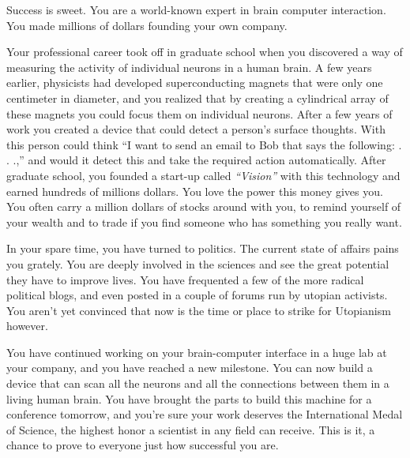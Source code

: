 \documentclass[char]{guildcamp1}
\begin{document}
\name{\cRival{}}


Success is sweet.  You are a world-known expert in brain computer interaction.  You made millions of dollars founding your own company.  

Your professional career took off in graduate school when you discovered a way of measuring the activity of individual neurons in a human brain.  A few years earlier, physicists had developed superconducting magnets that were only one centimeter in diameter, and you realized that by creating a cylindrical array of these magnets you could focus them on individual neurons.  After a few years of work you created a device that could detect a person's surface thoughts. With this person could think ``I want to send an email to Bob that says the following: . . .,'' and would it detect this and take the required action automatically.  After graduate school, you founded a start-up called {\em ``Vision''} with this technology and earned hundreds of  millions dollars.  You love the power this money gives you.  You often carry a million dollars of stocks around with you, to remind yourself of your wealth and to trade if you find someone who has something you really want.

In your spare time, you have turned to politics.  The current state of affairs pains you grately.  You are deeply involved in the sciences and see the great potential they have to improve lives. You have frequented a few of the more radical political blogs, and even posted in a couple of forums run by utopian activists. You aren't yet convinced that now is the time or place to strike for Utopianism however.

You have continued working on your brain-computer interface in a huge lab at your company, and you have reached a new milestone.  You can now build a device that can scan all the neurons and all the connections between them in a living human brain.  You have brought the parts to build this machine for a conference tomorrow, and you're sure your work deserves the International Medal of Science, the highest honor a scientist in any field can receive.  This is it, a chance to prove to everyone just how successful you are.
\end{document}
